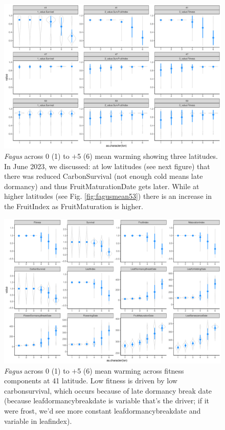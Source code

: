 \documentclass[11pt,letter]{article}
\begin{document}
\begin{figure} 
 \begin{center}
\noindent \includegraphics[width=1\textwidth]{..//analyses/graphs/phenofit/sims/metrics3/meansim_3metricsFS.pdf}
  \caption{\emph{Fagus} across 0 (1) to $+$5 (6) mean warming showing three latitudes. In June 2023, we discussed: at low latitudes (see next figure) that there was reduced CarbonSurvival (not enough cold means late dormancy) and thus FruitMaturationDate gets later. While at higher latitudes (see Fig. \ref{fig:fagusmean53}) there is an increase in the FruitIndex as FruitMaturation is higher.}
  \label{fig:fagusmean3}
  \end{center}
\end{figure}

\begin{figure} 
 \begin{center}
\noindent \includegraphics[width=1\textwidth]{..//analyses/graphs/phenofit/sims/meansim41_allmetricsFS.pdf}
  \caption{\emph{Fagus} across 0 (1) to $+$5 (6) mean warming across fitness components at 41 latitude. Low fitness is driven by low carbonsurvival, which occurs because of late dormancy break date (because leafdormancybreakdate is variable that's the driver; if it were frost, we'd see more constant leafdormancybreakdate and variable in leafindex).}
  \label{fig:fagusmean41}
  \end{center}
\end{figure}
\end{document}
